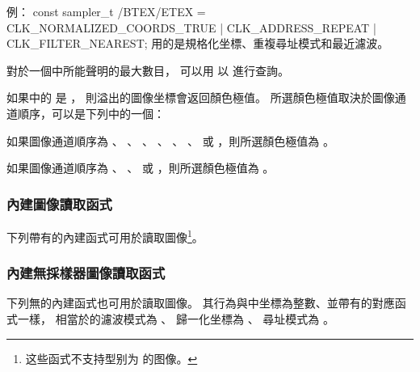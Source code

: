 {}

例：
\startclc[indentnext=no]
const sampler_t /BTEX/ETEX = CLK_NORMALIZED_COORDS_TRUE
			| CLK_ADDRESS_REPEAT
			| CLK_FILTER_NEAREST;
\stopclc
{} {} 用的是規格化坐標、重複尋址模式和最近濾波。

對於一個中所能聲明的最大數目，
可以用  以  進行查詢。


如果中的  是 ，
則溢出的圖像坐標會返回顏色極值。
所選顏色極值取決於圖像通道順序，可以是下列中的一個：
\startigBase
\item 如果圖像通道順序為 、 、 、
、 、 、 
 或 ，則所選顏色極值為 。

\item 如果圖像通道順序為 、 、 
 或 ，則所選顏色極值為 。
\stopigBase

\subsubsection[section:builtInImgReadFunc]{內建圖像讀取函式}

下列帶有的內建函式可用於讀取圖像\footnote{%
这些函式不支持型别为  的图像。%
}。

{}

\subsubsection{內建無採樣器圖像讀取函式}

下列無的內建函式也可用於讀取圖像。
其行為與\insection[builtInImgReadFunc]中坐標為整數、並帶有的對應函式一樣，
相當於的濾波模式為 、
歸一化坐標為 、
尋址模式為 。


